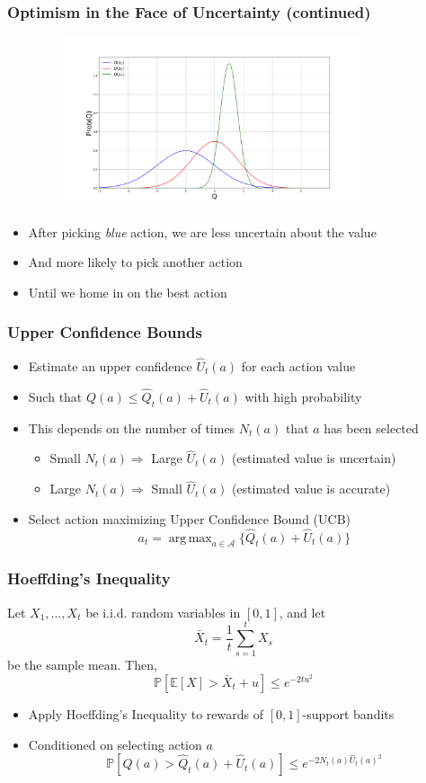 \documentclass[handout]{beamer}
\DeclareMathOperator*{\argmax}{arg\,max}
\begin{document}
\begin{frame}
\frametitle{Optimism in the Face of Uncertainty (continued)}
\pause
\includegraphics[width=12cm, height=5cm]{q_pdfs2.png}
\begin{itemize}[<+->]
\item After picking {\em blue} action, we are less uncertain about the value
\item And more likely to pick another action
 \item Until we home in on the best action
\end{itemize}
\end{frame}



\begin{frame}
\frametitle{Upper Confidence Bounds}
\pause
\begin{itemize}[<+->]
\item Estimate an upper confidence $\hat{U}_t(a)$ for each action value
\item Such that $Q(a) \leq \hat{Q}_t(a) + \hat{U}_t(a)$ with high probability
\item This depends on the number of times $N_t(a)$ that $a$ has been selected
\begin{itemize}
\item Small $N_t(a) \Rightarrow$ Large $\hat{U}_t(a)$ (estimated value is uncertain)
\item Large $N_t(a) \Rightarrow$ Small $\hat{U}_t(a)$ (estimated value is accurate)
\end{itemize}
\item Select action maximizing Upper Confidence  Bound (UCB)
$$a_t = \argmax_{a\in\mathcal{A}} \{ \hat{Q}_t(a) + \hat{U}_t(a) \}$$
\end{itemize}
\end{frame}

\begin{frame}
\frametitle{Hoeffding's Inequality}
\pause
\begin{theorem}
Let $X_1, \ldots, X_t$ be i.i.d. random variables in $[0,1]$, and let $$\bar{X}_t = \frac 1 t \sum_{s=1}^t X_s$$ be the sample mean. Then,
$$\mathbb{P}[\mathbb{E}[X] > \bar{X}_t + u] \leq e^{-2tu^2}$$
\end{theorem}
\begin{itemize}[<+->]
\item Apply Hoeffding's Inequality to rewards of $[0,1]$-support bandits
\item Conditioned on selecting action $a$
$$\mathbb{P}[Q(a) > \hat{Q}_t(a) + \hat{U}_t(a)] \leq e^{-2N_t(a)\hat{U}_t(a)^2}$$
\end{itemize}
\end{frame}
\end{document}
